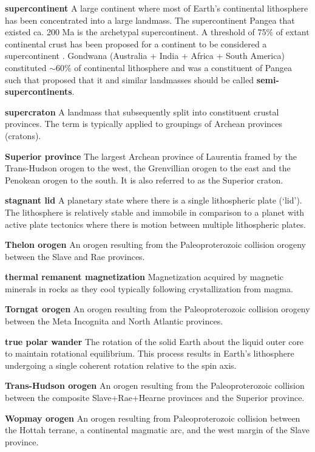 \documentclass[twocolumn, switch]{article} %
\begin{document}
\noindent\textbf{supercontinent } A large continent where most of Earth's continental lithosphere has been concentrated into a large landmass. The supercontinent Pangea that existed ca. 200 Ma is the archetypal supercontinent. A threshold of 75$\%$ of extant continental crust has been proposed for a continent to be considered a supercontinent \citep{Meert2012a}.  Gondwana (Australia + India + Africa + South America) constituted $\sim$60$\%$ of continental lithosphere and was a constituent of Pangea such that \cite{Evans2016a} proposed that it and similar landmasses should be called \textbf{semi-supercontinents}.

\noindent\textbf{supercraton } A landmass that subsequently split into constituent crustal provinces. The term is typically applied to groupings of Archean provinces (cratons).

\noindent\textbf{Superior province } The largest Archean province of Laurentia framed by the Trans-Hudson orogen to the west, the Grenvillian orogen to the east and the Penokean orogen to the south. It is also referred to as the Superior craton.

\noindent\textbf{stagnant lid } A planetary state where there is a single lithospheric plate (`lid'). The lithosphere is relatively stable and immobile in comparison to a planet with active plate tectonics where there is motion between multiple lithospheric plates. 

\noindent\textbf{Thelon orogen } An orogen resulting from the Paleoproterozoic collision orogeny between the Slave and Rae provinces.

\noindent\textbf{thermal remanent magnetization } Magnetization acquired by magnetic minerals in rocks as they cool typically following crystallization from magma.

\noindent\textbf{Torngat orogen } An orogen resulting from the Paleoproterozoic collision orogeny between the Meta Incognita and North Atlantic provinces.

\noindent\textbf{true polar wander } The rotation of the solid Earth about the liquid outer core to maintain rotational equilibrium. This process results in Earth's lithosphere undergoing a single coherent rotation relative to the spin axis.

\noindent\textbf{Trans-Hudson orogen } An orogen resulting from the Paleoproterozoic collision between the composite Slave+Rae+Hearne provinces and the Superior province.

\noindent\textbf{Wopmay orogen } An orogen resulting from Paleoproterozoic collision between the Hottah terrane, a continental magmatic arc, and the west margin of the Slave province.
\end{document}
